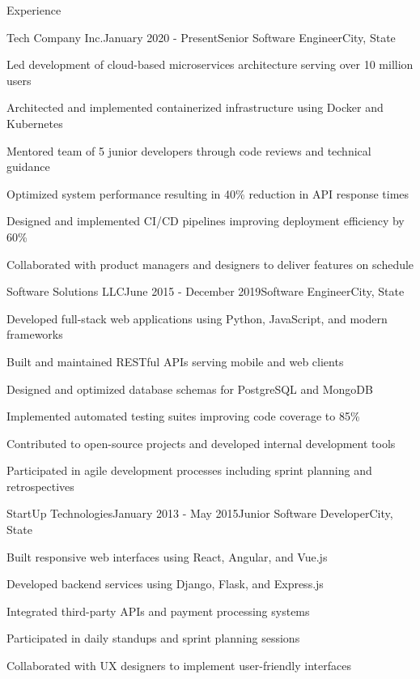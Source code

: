 \documentclass{resume} %
\begin{document}
\begin{rSection}{Experience}

\begin{rSubsection}{Tech Company Inc.}{January 2020 - Present}{Senior Software Engineer}{City, State}
\item Led development of cloud-based microservices architecture serving over 10 million users
\item Architected and implemented containerized infrastructure using Docker and Kubernetes
\item Mentored team of 5 junior developers through code reviews and technical guidance
\item Optimized system performance resulting in 40\% reduction in API response times
\item Designed and implemented CI/CD pipelines improving deployment efficiency by 60\%
\item Collaborated with product managers and designers to deliver features on schedule
\end{rSubsection}


\begin{rSubsection}{Software Solutions LLC}{June 2015 - December 2019}{Software Engineer}{City, State}
\item Developed full-stack web applications using Python, JavaScript, and modern frameworks
\item Built and maintained RESTful APIs serving mobile and web clients
\item Designed and optimized database schemas for PostgreSQL and MongoDB
\item Implemented automated testing suites improving code coverage to 85\%
\item Contributed to open-source projects and developed internal development tools
\item Participated in agile development processes including sprint planning and retrospectives
\end{rSubsection}


\begin{rSubsection}{StartUp Technologies}{January 2013 - May 2015}{Junior Software Developer}{City, State}
\item Built responsive web interfaces using React, Angular, and Vue.js
\item Developed backend services using Django, Flask, and Express.js
\item Integrated third-party APIs and payment processing systems
\item Participated in daily standups and sprint planning sessions
\item Collaborated with UX designers to implement user-friendly interfaces
\end{rSubsection}

\end{rSection}
\end{document}
